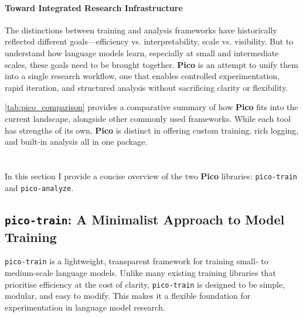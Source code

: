 
\paragraph{Toward Integrated Research Infrastructure}
The distinctions between training and analysis frameworks have historically reflected different goals—efficiency vs. interpretability, scale vs. visibility. But to understand how language models learn, especially at small and intermediate scales, these goals need to be brought together. \textbf{Pico} is an attempt to unify them into a single research workflow, one that enables controlled experimentation, rapid iteration, and structured analysis without sacrificing clarity or flexibility.

\cref{tab:pico_comparison} provides a comparative summary of how \textbf{Pico} fits into the current landscape, alongside other commonly used frameworks. While each tool has strengths of its own, \textbf{Pico} is distinct in offering custom training, rich logging, and built-in analysis all in one package.

\section[\picomed]{\picolarge}

In this section I provide a concise overview of the two \textbf{Pico} libraries: \texttt{pico-train} and \texttt{pico-analyze}. 

\subsection{\texttt{pico-train}: A Minimalist Approach to Model Training}

\texttt{pico-train} is a lightweight, transparent framework for training small- to medium-scale language models. Unlike many existing training libraries that prioritise efficiency at the cost of clarity, \texttt{pico-train} is designed to be simple, modular, and easy to modify. This makes it a flexible foundation for experimentation in language model research.


